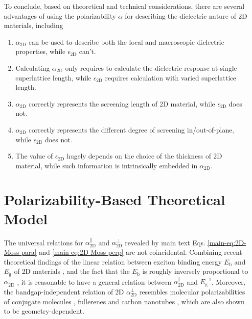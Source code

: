 \documentclass[manuscript=suppinfo,email=true,hyperref=true,keywords=false]{achemso}
\begin{document}
To conclude, based on theoretical and technical considerations, there are several
advantages of using the polarizability $\alpha$ for describing the dielectric
nature of 2D materials, including
\begin{enumerate}
\item $\alpha_{\mathrm{2D}}$ can be used to describe both the local and macroscopic dielectric properties, while $\epsilon_{\mathrm{2D}}$ can't.
\item Calculating $\alpha_{\mathrm{2D}}$ only requires to calculate the dielectric response at single superlattice length, while $\epsilon_{\mathrm{2D}}$ requires calculation with varied superlattice length.
\item $\alpha_{\mathrm{2D}}$ correctly represents the screening length of 2D material, while $\epsilon_{\mathrm{2D}}$ does not.
\item $\alpha_{\mathrm{2D}}$ correctly represents the different degree of screening in/out-of-plane, while $\epsilon_{\mathrm{2D}}$ does not.
  
\item The value of $\epsilon_{\mathrm{2D}}$ hugely depends on the
  choice of the thickness of 2D material, while such information is
  intrinsically embedded in $\alpha_{\mathrm{2D}}$.
\end{enumerate}


\section{Polarizability-Based Theoretical Model}
\label{sec:theory-1}
The universal relations for $\alpha_{\mathrm{2D}}^{\parallel}$ and
$\alpha_{\mathrm{2D}}^{\perp}$ revealed by main text
Eqs. \ref{main-eq:2D-Moss-para} and \ref{main-eq:2D-Moss-perp} are not
coincidental. Combining recent theoretical findings of the linear
relation between exciton binding energy $E_{\mathrm{b}}$ and
$E_{\mathrm{g}}$ of 2D materials
\cite{Choi_linear_2015,Olsen_2016_hydrogen,Jiang_2017_Eg_Eb}, and the
fact that the $E_{\mathrm{b}}$ is roughly inversely proportional to
$\alpha_{\mathrm{2D}}^{\parallel}$ \cite{Pulci_2014}, it is reasonable
to have a general relation between
$\alpha_{\mathrm{2D}}^{\parallel}$ and $E_{\mathrm{g}}^{-1}$. Moreover,
the bandgap-independent relation of 2D $\alpha_{\mathrm{2D}}^{\perp}$
resembles molecular polarizabilities of conjugate molecules
\cite{Davies_1952}, fullerenes \cite{Sabirov_2014} and carbon
nanotubes \cite{Benedict_1995}, which are also shown to be
geometry-dependent.
\end{document}
